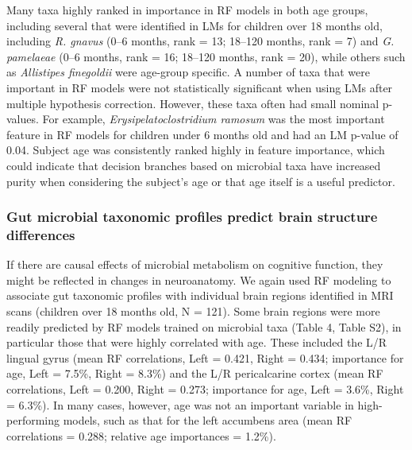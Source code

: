 \documentclass{article}
\begin{document}
Many taxa highly ranked in importance in RF models in both age
groups, including several that were identified in LMs for children over
18 months old, including \emph{R. gnavus} (0--6 months, rank = 13;
18--120 months, rank = 7) and \emph{G. pamelaeae} (0--6 months, rank =
16; 18--120 months, rank = 20), while others such as \emph{Allistipes
finegoldii} were age-group specific. A number of taxa that were important in RF models
were not statistically significant when using LMs after
multiple hypothesis correction. However, these taxa often had small nominal
p-values. For example, \emph{Erysipelatoclostridium ramosum} was the
most important feature in RF models for children under 6 months old and
had an LM p-value of 0.04. Subject age was consistently ranked highly in
feature importance, which could indicate that decision branches based on
microbial taxa have increased purity when considering the subject's age
or that age itself is a useful predictor.

\subsubsection*{Gut microbial taxonomic profiles predict brain structure differences}

If there are causal effects of microbial metabolism on cognitive
function, they might be reflected in changes in neuroanatomy. We again
used RF modeling to associate gut taxonomic
profiles with individual brain regions identified in MRI scans
(children over 18 months old, N = 121).
Some brain regions were more readily
predicted by RF models trained on microbial taxa (Table 4, Table S2), in particular those that were highly correlated with age.
These included the L/R lingual gyrus (mean RF correlations, Left =
0.421, Right = 0.434; importance for age, Left = 7.5\%, Right =
8.3\%) and the L/R pericalcarine cortex (mean RF correlations, Left =
0.200, Right = 0.273; importance for age, Left = 3.6\%, Right = 6.3\%).
In many cases, however, age was not an important variable in
high-performing models, such as that for the left accumbens area (mean
RF correlations = 0.288; relative age importances = 1.2\%).
\end{document}

